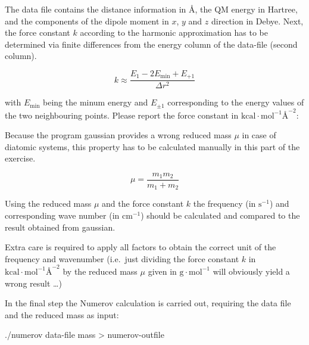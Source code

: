 \documentclass[
  letterpaper,
]{article}
\newenvironment{Shaded}{\begin{snugshade}}{\end{snugshade}}
\newcommand{\ExtensionTok}[1]{\textcolor[rgb]{0.00,0.23,0.31}{#1}}
\newcommand{\NormalTok}[1]{\textcolor[rgb]{0.00,0.23,0.31}{#1}}
\newcommand{\OperatorTok}[1]{\textcolor[rgb]{0.37,0.37,0.37}{#1}}
\begin{document}
The data file contains the distance information in Å, the QM energy in
Hartree, and the components of the dipole moment in \(x\), \(y\) and
\(z\) direction in Debye. Next, the force constant \(k\) according to
the harmonic approximation has to be determined via finite differences
from the energy column of the data-file (second column).

\[
k \approx \frac{E_1 -2 E_{\mathrm{min}} + E_{+1}}{\Delta r^2}
\]

with \(E_{\mathrm{min}}\) being the minum energy and \(E_{\pm 1}\)
corresponding to the energy values of the two neighbouring points.
Please report the force constant in
\(\mathrm{kcal\cdot mol^{-1}Å^{-2}}\):

Because the program gaussian provides a wrong reduced mass \(\mu\) in
case of diatomic systems, this property has to be calculated manually in
this part of the exercise.

\[
\mu = \frac{m_1 m_2}{m_1+m_2}
\]

Using the reduced mass \(μ\) and the force constant \(k\) the frequency
(in \(\mathrm{s^{-1}}\)) and corresponding wave number (in
\(\mathrm{cm^{-1}}\)) should be calculated and compared to the result
obtained from gaussian.

\begin{tcolorbox}[enhanced jigsaw, toptitle=1mm, opacitybacktitle=0.6, colframe=quarto-callout-note-color-frame, toprule=.15mm, breakable, bottomrule=.15mm, left=2mm, title=\textcolor{quarto-callout-note-color}{\faInfo}\hspace{0.5em}{Note}, titlerule=0mm, leftrule=.75mm, bottomtitle=1mm, coltitle=black, arc=.35mm, rightrule=.15mm, opacityback=0, colback=white, colbacktitle=quarto-callout-note-color!10!white]

Extra care is required to apply all factors to obtain the correct unit
of the frequency and wavenumber (i.e.~just dividing the force constant
\(k\) in \(\mathrm{kcal\cdot mol^{-1}Å^{-2}}\) by the reduced mass
\(\mu\) given in \(\mathrm{g \cdot mol^{-1}}\) will obviously yield a
wrong result \ldots)

\end{tcolorbox}

In the final step the Numerov calculation is carried out, requiring the
data file and the reduced mass as input:

\begin{Shaded}
\begin{Highlighting}[]
\ExtensionTok{./numerov}\NormalTok{    data{-}file   mass   }\OperatorTok{\textgreater{}}\NormalTok{  numerov{-}outfile}
\end{Highlighting}
\end{Shaded}
\end{document}
